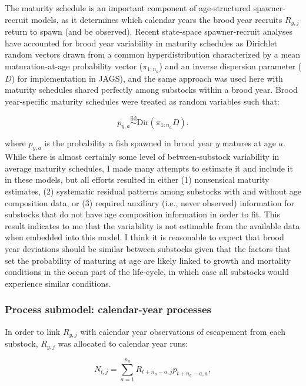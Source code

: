 \documentclass[12pt,]{book}
\theoremstyle{definition}
\theoremstyle{definition}
\theoremstyle{definition}
\theoremstyle{remark}
\begin{document}
The maturity schedule is an important component of age-structured
spawner-recruit models, as it determines which calendar years the brood
year recruits \(R_{y,j}\) return to spawn (and be observed). Recent
state-space spawner-recruit analyses have accounted for brood year
variability in maturity schedules as Dirichlet random vectors drawn from
a common hyperdistribution characterized by a mean maturation-at-age
probability vector (\(\pi_{1:n_a}\)) and an inverse dispersion parameter
(\(D\)) \citep[see][]{fleischman-etal-2013, staton-etal-2017-intseq} for
implementation in JAGS), and the same approach was used here with
maturity schedules shared perfectly among substocks within a brood year.
Brood year-specific maturity schedules were treated as random variables
such that:

\begin{equation}
  p_{y,a} \stackrel{\text{iid}}{\sim} \text{Dir}(\pi_{1:n_a} D). 
  \label{eq:dirichlet}
\end{equation}

\noindent
where \(p_{y,a}\) is the probability a fish spawned in brood year \(y\)
matures at age \(a\). While there is almost certainly some level of
between-substock variability in average maturity schedules, I made many
attempts to estimate it and include it in these models, but all efforts
resulted in either (1) nonsensical maturity estimates, (2) systematic
residual patterns among substocks with and without age composition data,
or (3) required auxiliary (i.e., never observed) information for
substocks that do not have age composition information in order to fit.
This result indicates to me that the variability is not estimable from
the available data when embedded into this model. I think it is
reasonable to expect that brood year deviations should be similar
between substocks given that the factors that set the probability of
maturing at age are likely linked to growth and mortality conditions in
the ocean part of the life-cycle, in which case all substocks would
experience similar conditions.

\subsubsection{Process submodel: calendar-year
processes}\label{ssm-cproc-model}

\noindent
In order to link \(R_{y,j}\) with calendar year observations of
escapement from each substock, \(R_{y,j}\) was allocated to calendar
year runs:

\begin{equation}
  N_{t,j}=\sum_{a=1}^{n_a} R_{t+n_a-a,j} p_{t+n_a-a,a},
  \label{eq:tsm-get-N}
\end{equation}
\end{document}
